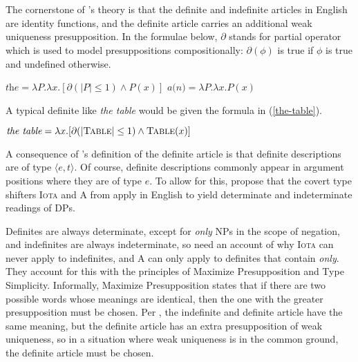 \section{\citet{cb2015} \label{sec:coppock-beaver}}
The cornerstone of \citeauthor{cb2015}'s theory is that the definite and indefinite articles in English are identity functions, and the definite article carries an additional weak uniqueness presupposition. In the formulae below, $\partial$ stands for  partial operator which is used to model presuppositions compositionally: $\partial(\phi)$ is true if $\phi$ is true and undefined otherwise.

\begin{exe}
	\ex $\textit{the} = \lambda P . \lambda x . [\partial(|P| \le 1) \land P(x)]$
	\ex $\textit{a(n)} = \lambda P . \lambda x . P(x)$
\end{exe}

A typical definite like \textit{the table} would be given the formula in (\ref{the-table}).

\begin{exe}
	\ex \label{the-table} $\textit{the table} = \lambda x . [ \partial(|\textsc{Table}| \le 1) \land \textsc{Table}(x) ]$
\end{exe}

A consequence of \citeauthor{cb2015}'s definition of the definite article is that definite descriptions are of type $\langle e, t \rangle$. Of course, definite descriptions commonly appear in argument positions where they are of type $e$. To allow for this, \citeauthor{cb2015} propose that the covert type shifters \textsc{Iota} and \textsc{A} from \citet{partee86} apply in English to yield determinate and indeterminate readings of DPs.

Definites are always determinate, except for \textit{only} NPs in the scope of negation, and indefinites are always indeterminate, so \citeauthor{cb2015} need an account of why \textsc{Iota} can never apply to indefinites, and \textsc{A} can only apply to definites that contain \textit{only}. They account for this with the principles of Maximize Presupposition and Type Simplicity. Informally, Maximize Presupposition states that if there are two possible words whose meanings are identical, then the one with the greater presupposition must be chosen. Per \citeauthor{cb2015}, the indefinite and definite article have the same meaning, but the definite article has an extra presupposition of weak uniqueness, so in a situation where weak uniqueness is in the common ground, the definite article must be chosen.

